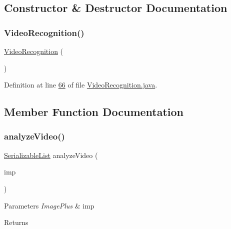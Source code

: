 \subsection{Constructor \& Destructor Documentation}
\hypertarget{classfunctions_1_1_video_recognition_a7901d0cc46df7762032f67cd822e30a5}{}\label{classfunctions_1_1_video_recognition_a7901d0cc46df7762032f67cd822e30a5} 
\subsubsection{\texorpdfstring{Video\+Recognition()}{VideoRecognition()}}
{\footnotesize\ttfamily \hyperlink{classfunctions_1_1_video_recognition}{Video\+Recognition} (\begin{DoxyParamCaption}{ }\end{DoxyParamCaption})}



Definition at line \hyperlink{_video_recognition_8java_source_l00066}{66} of file \hyperlink{_video_recognition_8java_source}{Video\+Recognition.\+java}.



\subsection{Member Function Documentation}
\hypertarget{classfunctions_1_1_video_recognition_a5472ba1ca2aba8ebc35bcb63634421e1}{}\label{classfunctions_1_1_video_recognition_a5472ba1ca2aba8ebc35bcb63634421e1} 
\subsubsection{\texorpdfstring{analyze\+Video()}{analyzeVideo()}}
{\footnotesize\ttfamily \hyperlink{classdata_1_1_serializable_list}{Serializable\+List} analyze\+Video (\begin{DoxyParamCaption}\item[{Image\+Plus}]{imp }\end{DoxyParamCaption})}


\begin{DoxyParams}{Parameters}
{\em Image\+Plus} & imp \\
\hline
\end{DoxyParams}
\begin{DoxyReturn}{Returns}

\end{DoxyReturn}


